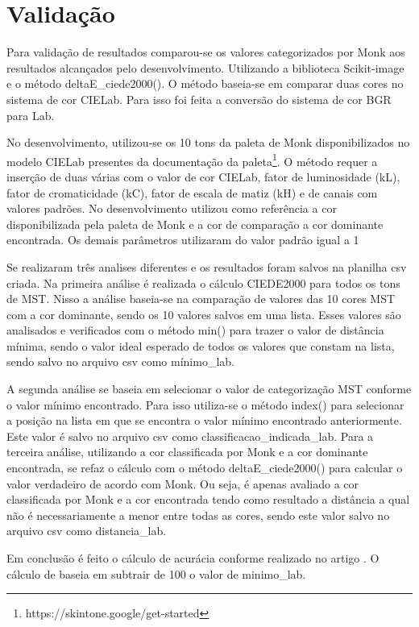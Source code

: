 \section{Validação}
Para validação de resultados comparou-se os valores categorizados por Monk aos resultados alcançados pelo desenvolvimento. Utilizando a biblioteca Scikit-image e o método deltaE\_ciede2000(). O método baseia-se em comparar duas cores no sistema de cor CIELab. Para isso foi feita a conversão do sistema de cor BGR para Lab.

No desenvolvimento, utilizou-se os 10 tons da paleta de Monk disponibilizados no modelo CIELab presentes da documentação da paleta\footnote{https://skintone.google/get-started}. O método requer a inserção de duas várias com o valor de cor CIELab, fator de luminosidade (kL), fator de cromaticidade (kC), fator de escala de matiz (kH) e de canais com valores padrões. No desenvolvimento utilizou como referência a cor disponibilizada pela paleta de Monk e a cor de comparação a cor dominante encontrada. Os demais parâmetros utilizaram do valor padrão igual a 1

Se realizaram três analises diferentes e os resultados foram salvos na planilha csv criada. Na primeira análise é realizada o cálculo CIEDE2000 para todos os tons de MST. Nisso a análise baseia-se na comparação de valores das 10 cores MST com a cor dominante, sendo os 10 valores salvos em uma lista. Esses valores são analisados e verificados com o método min() para trazer o valor de distância mínima, sendo o valor ideal esperado de todos os valores que constam na lista, sendo salvo no arquivo csv como mínimo\_lab. 

A segunda análise se baseia em selecionar o valor de categorização MST conforme o valor mínimo encontrado. Para isso utiliza-se o método index() para selecionar a posição na lista em que se encontra o valor mínimo encontrado anteriormente. Este valor é salvo no arquivo csv como classificacao\_indicada\_lab. Para a terceira análise, utilizando a cor classificada por Monk e a cor dominante encontrada, se refaz o cálculo com o método deltaE\_ciede2000() para calcular o valor verdadeiro de acordo com Monk. Ou seja, é apenas avaliado a cor classificada por Monk e a cor encontrada tendo como resultado a distância a qual não é necessariamente a menor entre todas as cores, sendo este valor salvo no arquivo csv como distancia\_lab.

Em conclusão é feito o cálculo de acurácia conforme realizado no artigo \cite{Classification_Algorithm_for_Skin_Color_CASCo_A_new_tool} . O cálculo de baseia em subtrair de 100 o valor de minimo\_lab. 


